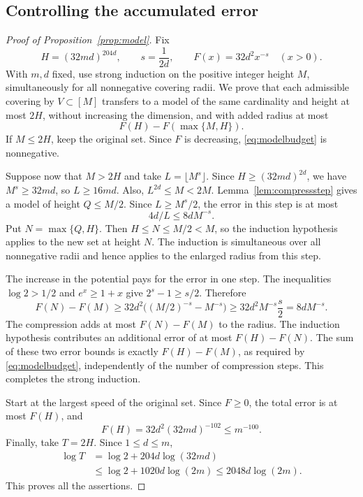 \documentclass[12pt,leqno]{article}
\numberwithin{equation}{section}
\theoremstyle{remark}
\begin{document}
\subsection{Controlling the accumulated error}
\begin{proof}[Proof of Proposition~\ref{prop:model}]
Fix
\[
H=(32md)^{204d},\qquad s=\frac1{2d},\qquad F(x)=32d^2x^{-s}\quad(x>0).
\]
With $m,d$ fixed, use strong induction on the positive integer height $M$, simultaneously for all nonnegative covering radii. We prove that each admissible covering by $V\subset[M]$ transfers to a model of the same cardinality and height at most $2H$, without increasing the dimension, and with added radius at most
\begin{equation}\label{eq:modelbudget}
F(H)-F(\max\{M,H\}).
\end{equation}
If $M\le2H$, keep the original set. Since $F$ is decreasing, \eqref{eq:modelbudget} is nonnegative.

Suppose now that $M>2H$ and take $L=\lfloor M^s\rfloor$. Since $H\ge(32md)^{2d}$, we have $M^s\ge32md$, so $L\ge16md$. Also, $L^{2d}\le M<2M$. Lemma~\ref{lem:compressstep} gives a model of height $Q\le M/2$. Since $L\ge M^s/2$, the error in this step is at most
\[
4d/L\le8dM^{-s}.
\]
Put $N=\max\{Q,H\}$. Then $H\le N\le M/2<M$, so the induction hypothesis applies to the new set at height $N$. The induction is simultaneous over all nonnegative radii and hence applies to the enlarged radius from this step.

The increase in the potential pays for the error in one step. The inequalities $\log2>1/2$ and $e^x\ge1+x$ give $2^s-1\ge s/2$. Therefore
\[
F(N)-F(M)\ge32d^2\bigl((M/2)^{-s}-M^{-s}\bigr)
\ge32d^2M^{-s}\frac{s}{2}=8dM^{-s}.
\]
The compression adds at most $F(N)-F(M)$ to the radius. The induction hypothesis contributes an additional error of at most $F(H)-F(N)$. The sum of these two error bounds is exactly $F(H)-F(M)$, as required by \eqref{eq:modelbudget}, independently of the number of compression steps. This completes the strong induction.

Start at the largest speed of the original set. Since $F\ge0$, the total error is at most $F(H)$, and
\[
F(H)=32d^2(32md)^{-102}\le m^{-100}.
\]
Finally, take $T=2H$. Since $1\le d\le m$,
\begin{align*}
\log T&=\log2+204d\log(32md)\\
&\le\log2+1020d\log(2m)
\le2048d\log(2m).
\end{align*}
This proves all the assertions.
\end{proof}
\end{document}
